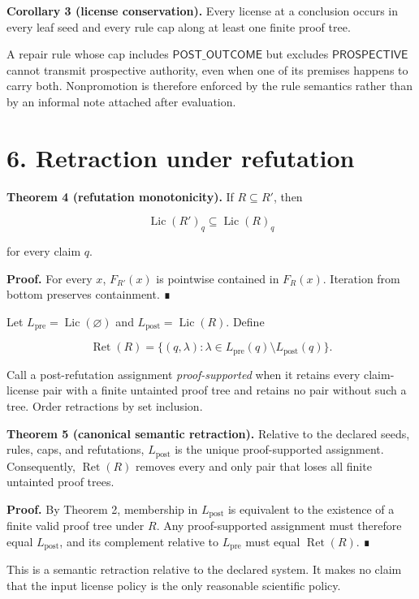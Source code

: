 \documentclass[
  11pt,
]{article}
\begin{document}
\textbf{Corollary 3 (license conservation).} Every license at a
conclusion occurs in every leaf seed and every rule cap along at least
one finite proof tree.

A repair rule whose cap includes \(\textsf{POST\_OUTCOME}\) but excludes
\(\textsf{PROSPECTIVE}\) cannot transmit prospective authority, even
when one of its premises happens to carry both. Nonpromotion is
therefore enforced by the rule semantics rather than by an informal note
attached after evaluation.

\hypertarget{retraction-under-refutation}{%
\section{6. Retraction under
refutation}\label{retraction-under-refutation}}

\textbf{Theorem 4 (refutation monotonicity).} If \(R\subseteq R'\), then

\[
\operatorname{Lic}(R')_q\subseteq\operatorname{Lic}(R)_q
\]

for every claim \(q\).

\textbf{Proof.} For every \(x\), \(F_{R'}(x)\) is pointwise contained in
\(F_R(x)\). Iteration from bottom preserves containment. ∎

Let \(L_{\mathrm{pre}}=\operatorname{Lic}(\varnothing)\) and
\(L_{\mathrm{post}}=\operatorname{Lic}(R)\). Define

\[
\operatorname{Ret}(R)
=\{(q, \lambda):
\lambda\in L_{\mathrm{pre}}(q)\setminus L_{\mathrm{post}}(q)\}.
\]

Call a post-refutation assignment \emph{proof-supported} when it retains
every claim-license pair with a finite untainted proof tree and retains
no pair without such a tree. Order retractions by set inclusion.

\textbf{Theorem 5 (canonical semantic retraction).} Relative to the
declared seeds, rules, caps, and refutations, \(L_{\mathrm{post}}\) is
the unique proof-supported assignment. Consequently,
\(\operatorname{Ret}(R)\) removes every and only pair that loses all
finite untainted proof trees.

\textbf{Proof.} By Theorem 2, membership in \(L_{\mathrm{post}}\) is
equivalent to the existence of a finite valid proof tree under \(R\).
Any proof-supported assignment must therefore equal
\(L_{\mathrm{post}}\), and its complement relative to
\(L_{\mathrm{pre}}\) must equal \(\operatorname{Ret}(R)\). ∎

This is a semantic retraction relative to the declared system. It makes
no claim that the input license policy is the only reasonable scientific
policy.
\end{document}
